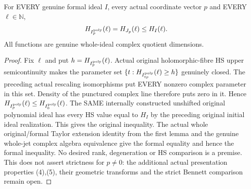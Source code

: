 \begin{theorem}
\label{hir:actual-translated-initial-all-order-hs-dominance}
For EVERY genuine formal ideal $I$, every actual coordinate vector $p$
and EVERY $\ell\in\mathbb N$,
\[
 H_{I_p^{\rm poly}}(\ell)=H_{J_p}(\ell)\le H_I(\ell).
\]
All functions are genuine whole-ideal complex quotient dimensions.
\leanok
\end{theorem}
\begin{proof}
Fix $\ell$ and put $h=H_{I_p^{\rm poly}}(\ell)$. Actual original
holomorphic-fibre HS upper semicontinuity makes the parameter set
$\{t:H_{I_{tp}^{\rm poly}}(\ell)\ge h\}$ genuinely closed.
The preceding actual rescaling isomorphisms put EVERY nonzero complex
parameter in this set. Density of the punctured complex line therefore
puts zero in it. Hence
$H_{I_p^{\rm poly}}(\ell)\le H_{I_0^{\rm poly}}(\ell)$.
The SAME internally constructed unshifted original polynomial ideal
has every HS value equal to $H_I$ by the preceding original initial
ideal realization. This gives the original inequality. The actual
whole original/formal Taylor extension identity from the first lemma
and the genuine whole-jet complex algebra equivalence give the formal
equality and hence the formal inequality. No desired rank, degeneration
or HS comparison is a premise. This does not assert strictness for
$p\ne0$: the additional actual presentation properties (4),(5), their
geometric transforms and the strict Bennett comparison remain open.
\end{proof}
